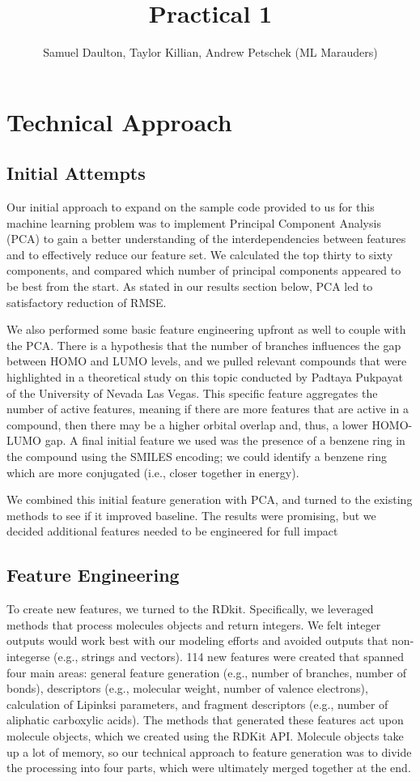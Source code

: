 \documentclass[11pt, oneside]{article}   	%
\title{Practical 1}
\author{Samuel Daulton, Taylor Killian, Andrew Petschek (ML Marauders)}
\begin{document}
\maketitle
\section{Technical Approach}
\subsection{Initial Attempts} 


Our initial approach to expand on the sample code provided to us for this machine learning problem was to implement Principal Component Analysis (PCA) to gain a better understanding of the interdependencies between features and to effectively reduce our feature set. We calculated the top thirty to sixty components, and compared which number of principal components appeared to be best from the start. As stated in our results section below, PCA led to satisfactory reduction of RMSE.

We also performed some basic feature engineering upfront as well to couple with the PCA. There is a hypothesis that the number of branches influences the gap between HOMO and LUMO levels, and we pulled relevant compounds that were highlighted in a theoretical study on this topic conducted by Padtaya Pukpayat of the University of Nevada Las Vegas. This specific feature aggregates the number of active features, meaning if there are more features that are active in a compound, then there may be a higher orbital overlap and, thus, a lower HOMO-LUMO gap. A final initial feature we used was the presence of a benzene ring in the compound using the SMILES encoding; we could identify a benzene ring  which are more conjugated (i.e., closer together in energy). 

We combined this initial feature generation with PCA, and turned to the existing methods to see if it improved baseline. The results were promising, but we decided additional features needed to be engineered for full impact 

\subsection{Feature Engineering} 

To create new features, we turned to the RDkit. Specifically, we leveraged methods that process molecules objects and return integers. We felt integer outputs would work best with our modeling efforts and avoided outputs that non-integerse (e.g., strings and vectors). 114 new features were created that spanned four main areas: general feature generation (e.g., number of branches, number of bonds), descriptors (e.g., molecular weight, number of valence electrons), calculation of Lipinksi parameters, and fragment descriptors (e.g., number of aliphatic carboxylic acids). The methods that generated these features act upon molecule objects, which we created using the RDKit API. Molecule objects take up a lot of memory, so our technical approach to feature generation was to divide the processing into four parts, which were ultimately merged together at the end. 
\end{document}
